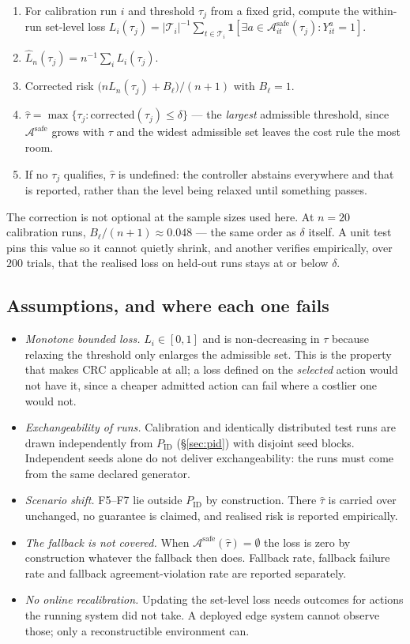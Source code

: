 \documentclass[journal]{IEEEtran}
\newcommand{\Aset}{\mathcal{A}}
\begin{document}
\begin{enumerate}
\item For calibration run $i$ and threshold $\tau_j$ from a fixed grid, compute
the within-run set-level loss
$L_i(\tau_j)=|\mathcal{T}_i|^{-1}\sum_{t\in\mathcal{T}_i}
\mathbf{1}[\exists a\in\Aset^{\mathrm{safe}}_{it}(\tau_j): Y^a_{it}=1]$.
\item $\hat L_n(\tau_j)=n^{-1}\sum_i L_i(\tau_j)$.
\item Corrected risk $\bigl(n\hat L_n(\tau_j)+B_\ell\bigr)/(n+1)$ with $B_\ell=1$.
\item $\hat\tau=\max\{\tau_j:\text{corrected}(\tau_j)\le\delta\}$ --- the
\emph{largest} admissible threshold, since $\Aset^{\mathrm{safe}}$ grows with
$\tau$ and the widest admissible set leaves the cost rule the most room.
\item If no $\tau_j$ qualifies, $\hat\tau$ is undefined: the controller abstains
everywhere and that is reported, rather than the level being relaxed until
something passes.
\end{enumerate}

The correction is not optional at the sample sizes used here. At $n=20$
calibration runs, $B_\ell/(n+1)\approx0.048$ --- the same order as $\delta$
itself. A unit test pins this value so it cannot quietly shrink, and another
verifies empirically, over $200$ trials, that the realised loss on held-out runs
stays at or below $\delta$.

\subsection{Assumptions, and where each one fails}
\begin{itemize}
\item \emph{Monotone bounded loss.} $L_i\in[0,1]$ and is non-decreasing in
$\tau$ because relaxing the threshold only enlarges the admissible set. This is
the property that makes CRC applicable at all; a loss defined on the
\emph{selected} action would not have it, since a cheaper admitted action can
fail where a costlier one would not.
\item \emph{Exchangeability of runs.} Calibration and identically distributed
test runs are drawn independently from $P_{\mathrm{ID}}$
(\S\ref{sec:pid}) with disjoint seed blocks. Independent seeds alone do not
deliver exchangeability: the runs must come from the same declared generator.
\item \emph{Scenario shift.} F5--F7 lie outside $P_{\mathrm{ID}}$ by
construction. There $\hat\tau$ is carried over unchanged, no guarantee is
claimed, and realised risk is reported empirically.
\item \emph{The fallback is not covered.} When
$\Aset^{\mathrm{safe}}(\hat\tau)=\emptyset$ the loss is zero by construction
whatever the fallback then does. Fallback rate, fallback failure rate and
fallback agreement-violation rate are reported separately.
\item \emph{No online recalibration.} Updating the set-level loss needs outcomes
for actions the running system did not take. A deployed edge system cannot
observe those; only a reconstructible environment can.
\end{itemize}
\end{document}
